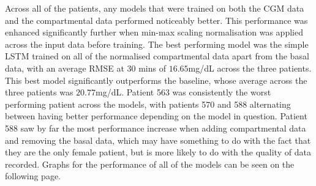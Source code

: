       Across all of the patients, any models that were trained on both the CGM data and the compartmental data performed noticeably better. This performance was enhanced significantly further when min-max scaling normalisation \cite{minmax} was applied across the input data before training. The best performing model was the simple LSTM trained on all of the normalised compartmental data apart from the basal data, with an average RMSE at 30 mins of $16.65$mg/dL across the three patients. This best model significantly outperforms the baseline, whose average across the three patients was $20.77$mg/dL. Patient 563 was consistently the worst performing patient across the models, with patients 570 and 588 alternating between having better performance depending on the model in question. Patient 588 saw by far the most performance increase when adding compartmental data and removing the basal data, which may have something to do with the fact that they are the only female patient, but is more likely to do with the quality of data recorded. Graphs for the performance of all of the models can be seen on the following page.
      \newpage

